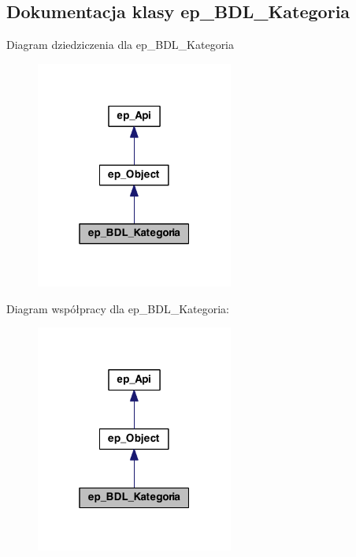 \hypertarget{classep___b_d_l___kategoria}{\subsection{Dokumentacja klasy ep\-\_\-\-B\-D\-L\-\_\-\-Kategoria}
\label{classep___b_d_l___kategoria}
}


Diagram dziedziczenia dla ep\-\_\-\-B\-D\-L\-\_\-\-Kategoria\nopagebreak
\begin{figure}[H]
\begin{center}
\leavevmode
\includegraphics[width=184pt]{classep___b_d_l___kategoria__inherit__graph}
\end{center}
\end{figure}


Diagram współpracy dla ep\-\_\-\-B\-D\-L\-\_\-\-Kategoria\-:\nopagebreak
\begin{figure}[H]
\begin{center}
\leavevmode
\includegraphics[width=184pt]{classep___b_d_l___kategoria__coll__graph}
\end{center}
\end{figure}
